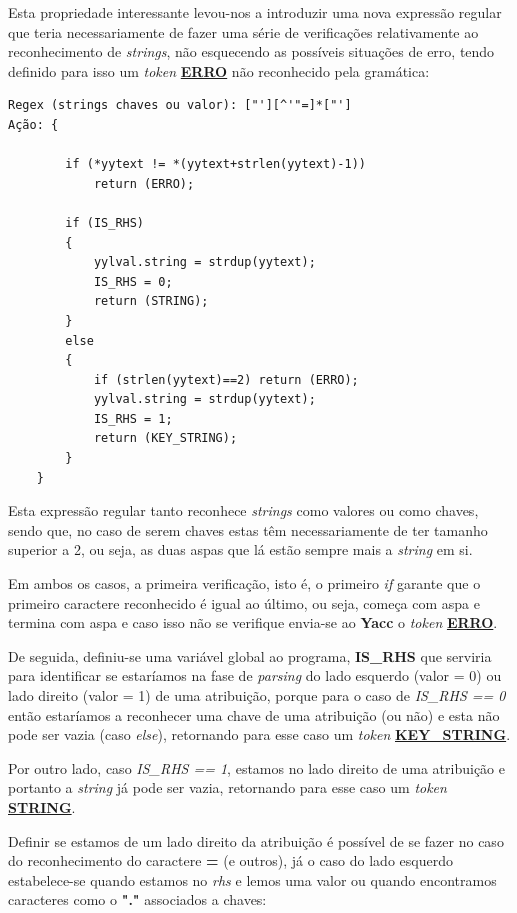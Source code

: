 \documentclass[a4paper,12pt]{report}
\begin{document}
\begin{enumerate}
Esta propriedade interessante levou-nos a introduzir uma nova expressão regular que teria necessariamente de fazer uma série de verificações relativamente ao reconhecimento de \textit{strings}, não esquecendo as possíveis situações de erro, tendo definido para isso um \textit{token} \underline{\textbf{ERRO}} não reconhecido pela gramática:

\begin{verbatim}
Regex (strings chaves ou valor): ["'][^'"=]*["']       
Ação: { 
        
        if (*yytext != *(yytext+strlen(yytext)-1)) 
            return (ERRO);
                          
        if (IS_RHS) 
        {
            yylval.string = strdup(yytext); 
            IS_RHS = 0;
            return (STRING);
        } 
        else 
        {
            if (strlen(yytext)==2) return (ERRO);
            yylval.string = strdup(yytext); 
            IS_RHS = 1;
            return (KEY_STRING);
        }
    }                
\end{verbatim}

Esta expressão regular tanto reconhece \textit{strings} como valores ou como chaves, sendo que, no caso de serem chaves estas têm necessariamente de ter tamanho superior a 2, ou seja, as duas aspas que lá estão sempre mais a \textit{string} em si.
\par
Em ambos os casos, a primeira verificação, isto é, o primeiro \textit{if} garante que o primeiro caractere reconhecido é igual ao último, ou seja, começa com aspa e termina com aspa e caso isso não se verifique envia-se ao \textbf{Yacc} o \textit{token} \underline{\textbf{ERRO}}.
\par
De seguida, definiu-se uma variável global ao programa,  \textbf{IS\_RHS} que serviria para identificar se estaríamos na fase de \textit{parsing} do lado esquerdo (valor = 0) ou lado direito (valor = 1) de uma atribuição, porque para o caso de \textit{IS\_RHS == 0} então estaríamos a reconhecer uma chave de uma atribuição (ou não) e esta não pode ser vazia (caso \textit{else}), retornando para esse caso um \textit{token} \underline{\textbf{KEY\_STRING}}. 
\par
Por outro lado, caso \textit{IS\_RHS == 1}, estamos no lado direito de uma atribuição e portanto a \textit{string} já pode ser vazia, retornando para esse caso um \textit{token} \underline{\textbf{STRING}}.

\par
Definir se estamos de um lado direito da atribuição é possível de se fazer no caso do reconhecimento do caractere \textbf{=} (e outros), já o caso do lado esquerdo estabelece-se quando estamos no \textit{rhs} e lemos uma valor ou quando encontramos caracteres como o \textbf{"."} associados a chaves:


\end{enumerate}
\end{document}
